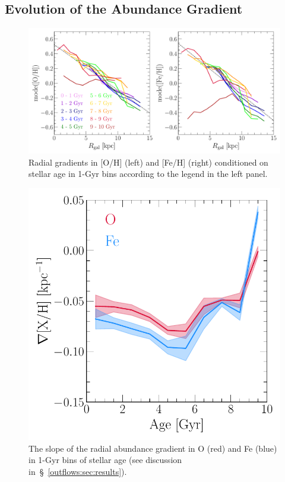 \subsection{Evolution of the Abundance Gradient}
\label{outflows:sec:results:evolution}

\begin{figure}
\centering
\includegraphics[scale = 0.55]{gradxh_fixedage.pdf}
\caption{
Radial gradients in [O/H] (left) and [Fe/H] (right) conditioned on stellar age
in 1-Gyr bins according to the legend in the left panel.
}
\label{outflows:fig:gradxh-fixed-age}
\end{figure}



\begin{figure}
\centering
\includegraphics[scale = 0.6]{gradxh_vs_age.pdf}
\caption{
The slope of the radial abundance gradient in O (red) and Fe (blue) in 1-Gyr
bins of stellar age (see discussion
in~\S~\ref{outflows:sec:results}).
}
\label{outflows:fig:gradxh-vs-age}
\end{figure}

